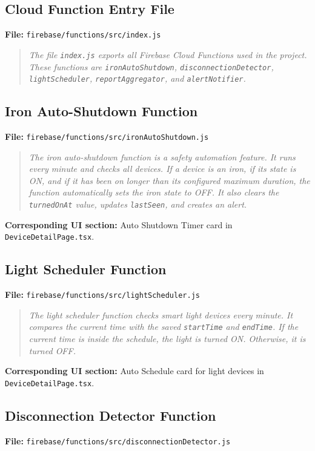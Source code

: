 \documentclass[11pt,a4paper]{article}
\begin{document}
\subsection{Cloud Function Entry File}
\textbf{File:} \texttt{firebase/functions/src/index.js}

\begin{quote}
\textit{The file \texttt{index.js} exports all Firebase Cloud Functions used in the project. These functions are \texttt{ironAutoShutdown}, \texttt{disconnectionDetector}, \texttt{lightScheduler}, \texttt{reportAggregator}, and \texttt{alertNotifier}.}
\end{quote}

\subsection{Iron Auto-Shutdown Function}
\textbf{File:} \texttt{firebase/functions/src/ironAutoShutdown.js}

\begin{quote}
\textit{The iron auto-shutdown function is a safety automation feature. It runs every minute and checks all devices. If a device is an iron, if its state is ON, and if it has been on longer than its configured maximum duration, the function automatically sets the iron state to OFF. It also clears the \texttt{turnedOnAt} value, updates \texttt{lastSeen}, and creates an alert.}
\end{quote}

\textbf{Corresponding UI section:} Auto Shutdown Timer card in \texttt{DeviceDetailPage.tsx}.

\subsection{Light Scheduler Function}
\textbf{File:} \texttt{firebase/functions/src/lightScheduler.js}

\begin{quote}
\textit{The light scheduler function checks smart light devices every minute. It compares the current time with the saved \texttt{startTime} and \texttt{endTime}. If the current time is inside the schedule, the light is turned ON. Otherwise, it is turned OFF.}
\end{quote}

\textbf{Corresponding UI section:} Auto Schedule card for light devices in \texttt{DeviceDetailPage.tsx}.

\subsection{Disconnection Detector Function}
\textbf{File:} \texttt{firebase/functions/src/disconnectionDetector.js}
\end{document}

